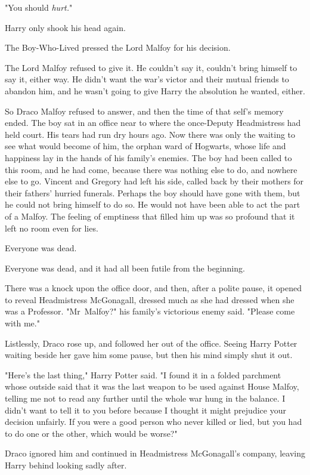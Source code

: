 "You should \emph{hurt.}"

Harry only shook his head again.

The Boy-Who-Lived pressed the Lord Malfoy for his decision.

The Lord Malfoy refused to give it. He couldn't say it, couldn't bring himself
to say it, either way. He didn't want the war's victor and their mutual friends
to abandon him, and he wasn't going to give Harry the absolution he wanted,
either.

So Draco Malfoy refused to answer, and then the time of that self's memory
ended.
\later
The boy sat in an office near to where the once-Deputy Headmistress had held
court. His tears had run dry hours ago. Now there was only the waiting to see
what would become of him, the orphan ward of Hogwarts, whose life and happiness
lay in the hands of his family's enemies. The boy had been called to this room,
and he had come, because there was nothing else to do, and nowhere else to go.
Vincent and Gregory had left his side, called back by their mothers for their
fathers' hurried funerals. Perhaps the boy should have gone with them, but he
could not bring himself to do so. He would not have been able to act the part
of a Malfoy. The feeling of emptiness that filled him up was so profound that
it left no room even for lies.

Everyone was dead.

Everyone was dead, and it had all been futile from the beginning.

There was a knock upon the office door, and then, after a polite pause, it
opened to reveal Headmistress McGonagall, dressed much as she had dressed when
she was a Professor. "Mr~Malfoy?" his family's victorious enemy said. "Please
come with me."

Listlessly, Draco rose up, and followed her out of the office. Seeing Harry
Potter waiting beside her gave him some pause, but then his mind simply shut it
out.

"Here's the last thing," Harry Potter said. "I found it in a folded parchment
whose outside said that it was the last weapon to be used against House Malfoy,
telling me not to read any further until the whole war hung in the balance. I
didn't want to tell it to you before because I thought it might prejudice your
decision unfairly. If you were a good person who never killed or lied, but you
had to do one or the other, which would be worse?"

Draco ignored him and continued in Headmistress McGonagall's company, leaving
Harry behind looking sadly after.

